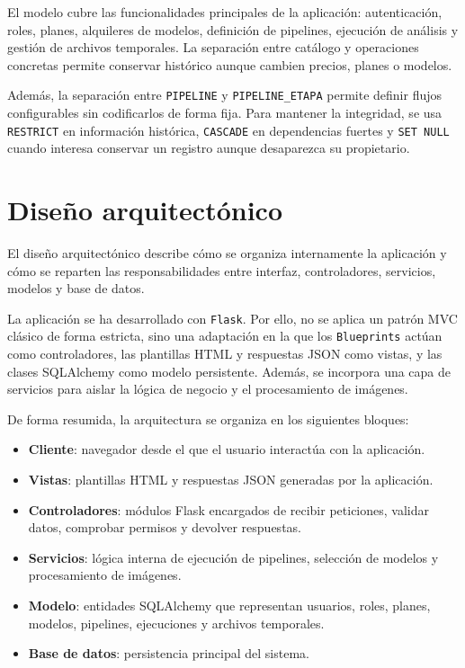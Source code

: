El modelo cubre las funcionalidades principales de la aplicación: autenticación, roles, planes, alquileres de modelos, definición de pipelines, ejecución de análisis y gestión de archivos temporales. La separación entre catálogo y operaciones concretas permite conservar histórico aunque cambien precios, planes o modelos.

Además, la separación entre \texttt{PIPELINE} y \texttt{PIPELINE\_ETAPA} permite definir flujos configurables sin codificarlos de forma fija. Para mantener la integridad, se usa \texttt{RESTRICT} en información histórica, \texttt{CASCADE} en dependencias fuertes y \texttt{SET NULL} cuando interesa conservar un registro aunque desaparezca su propietario.
\endgroup
\clearpage
\section{Diseño arquitectónico}

El diseño arquitectónico describe cómo se organiza internamente la aplicación y cómo se reparten las responsabilidades entre interfaz, controladores, servicios, modelos y base de datos.

La aplicación se ha desarrollado con \texttt{Flask}. Por ello, no se aplica un patrón MVC clásico de forma estricta, sino una adaptación en la que los \texttt{Blueprints} actúan como controladores, las plantillas HTML y respuestas JSON como vistas, y las clases SQLAlchemy como modelo persistente. Además, se incorpora una capa de servicios para aislar la lógica de negocio y el procesamiento de imágenes.

De forma resumida, la arquitectura se organiza en los siguientes bloques:

\begin{itemize}
	\item \textbf{Cliente}: navegador desde el que el usuario interactúa con la aplicación.
	\item \textbf{Vistas}: plantillas HTML y respuestas JSON generadas por la aplicación.
	\item \textbf{Controladores}: módulos Flask encargados de recibir peticiones, validar datos, comprobar permisos y devolver respuestas.
	\item \textbf{Servicios}: lógica interna de ejecución de pipelines, selección de modelos y procesamiento de imágenes.
	\item \textbf{Modelo}: entidades SQLAlchemy que representan usuarios, roles, planes, modelos, pipelines, ejecuciones y archivos temporales.
	\item \textbf{Base de datos}: persistencia principal del sistema.
\end{itemize}

